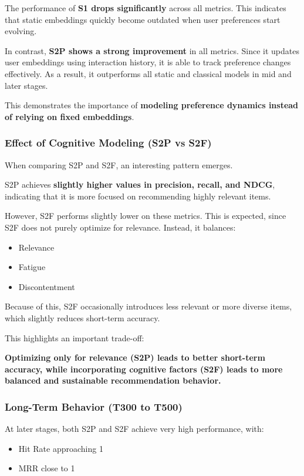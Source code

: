 The performance of \textbf{S1 drops significantly} across all metrics. 
This indicates that static embeddings quickly become outdated when user preferences start evolving.

In contrast, \textbf{S2P shows a strong improvement} in all metrics. 
Since it updates user embeddings using interaction history, it is able to track preference changes effectively. 
As a result, it outperforms all static and classical models in mid and later stages.

This demonstrates the importance of \textbf{modeling preference dynamics instead of relying on fixed embeddings}.

\subsubsection{Effect of Cognitive Modeling (S2P vs S2F)}

When comparing S2P and S2F, an interesting pattern emerges.

S2P achieves \textbf{slightly higher values in precision, recall, and NDCG}, indicating that it is more focused on recommending highly relevant items.

However, S2F performs slightly lower on these metrics. 
This is expected, since S2F does not purely optimize for relevance. 
Instead, it balances:

\begin{itemize}
    \item Relevance
    \item Fatigue
    \item Discontentment
\end{itemize}

Because of this, S2F occasionally introduces less relevant or more diverse items, which slightly reduces short-term accuracy.

This highlights an important trade-off:

\textbf{Optimizing only for relevance (S2P) leads to better short-term accuracy, while incorporating cognitive factors (S2F) leads to more balanced and sustainable recommendation behavior.}

\subsubsection{Long-Term Behavior (T300 to T500)}

At later stages, both S2P and S2F achieve very high performance, with:

\begin{itemize}
    \item Hit Rate approaching 1
    \item MRR close to 1
\end{itemize}

